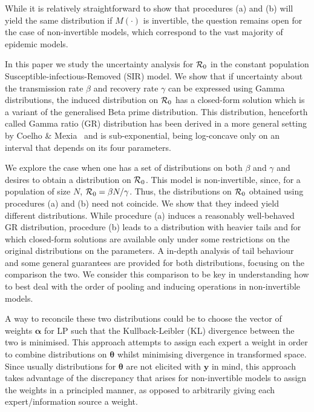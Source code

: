 \documentclass[11pt]{article}
\begin{document}
While it is relatively straightforward to show that procedures (a) and (b) will yield the same distribution if $M(\cdot)$ is invertible, the question remains open for the case of non-invertible models, which correspond to the vast majority of epidemic models.

In this paper we study the uncertainty analysis for ${\cal R}_0$ in the constant population Susceptible-infectious-Removed (SIR) model.
We show that if uncertainty about the transmission rate $\beta$ and recovery rate $\gamma$ can be expressed using Gamma distributions, the induced distribution on ${\cal R}_0$ has a closed-form solution which is a variant of the generalised Beta prime distribution.
This distribution, henceforth called Gamma ratio (GR) distribution has been derived in a more general setting by Coelho \& Mexia~\cite{Coelho2007} and is sub-exponential, being log-concave only on an interval that depends on its four parameters.%

We explore the case when one has a set of distributions on both $\beta$ and $\gamma$ and desires to obtain a distribution on ${\cal R}_0$.
This model is non-invertible, since, for a population of size $N$,  ${\cal R}_0 = \beta N/\gamma$.
Thus, the distributions on ${\cal R}_0$ obtained using procedures (a) and (b) need not coincide. %
We show that they indeed yield different distributions.
While procedure (a) induces a reasonably well-behaved GR distribution, procedure (b) leads to a distribution with heavier tails and for which closed-form 
solutions are available only under some restrictions on the original distributions on the parameters.
A in-depth analysis of tail behaviour and some general guarantees are provided for both distributions, focusing on the comparison the two.
We consider this comparison to be key in understanding how to best deal with the order of pooling and inducing operations in non-invertible models.

A way to reconcile these two distributions could be to choose the vector of weights $\boldsymbol\alpha$ for LP such that the Kullback-Leibler (KL) divergence between the two is minimised.
This approach attempts to assign each expert a weight in order to combine distributions on $\boldsymbol\theta$ whilst minimising divergence in transformed space.
Since usually distributions for $\boldsymbol\theta$ are not elicited with $\mathbf{y}$ in mind, this approach takes advantage of the discrepancy that arises for non-invertible models to assign the weights in a principled manner, as opposed to arbitrarily giving each expert/information source a weight.
\end{document}
